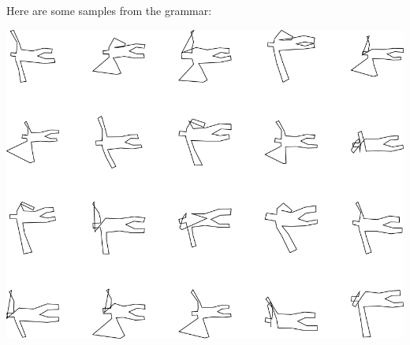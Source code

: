 Here are some samples from the grammar:

\includegraphics[width=6in]{output/3.learning/incremental/gram.12.d/samples.png}


